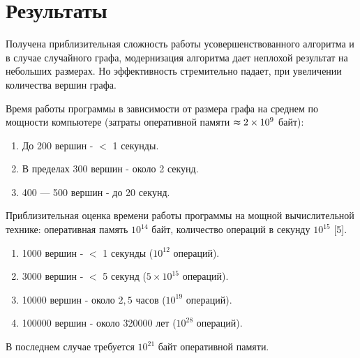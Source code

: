 \section{Результаты}
\label{sec:Chapter5} 
\large



Получена приблизительная сложность работы усовершенствованного алгоритма и в случае случайного графа, модернизация алгоритма дает неплохой результат на небольших размерах. Но эффективность стремительно падает, при увеличении количества вершин графа.

Время работы программы в зависимости от размера графа на среднем по мощности компьютере (затраты оперативной памяти $\thickapprox 2\times 10^9$ байт):
\begin{enumerate}
\item  До 200 вершин - $<$ 1 секунды.
\item  В пределах 300 вершин - около 2 секунд.
\item  400 — 500 вершин - до 20 секунд.
\end{enumerate}




Приблизительная оценка времени работы программы на мощной вычислительной технике:
оперативная память $10^{14}$ байт,
количество операций в секунду $10^{15}$ [5].
\begin{enumerate}
\item 1000 вершин - $<$ 1 секунды  ($10^{12}$  операций).
\item 3000 вершин - $<$ 5 секунд ($5\times 10^{15}$ операций).
\item 10000 вершин - около $2,5$ часов ($10^{19}$ операций).
\item 100000 вершин - около 320000 лет ($10 ^{28}$ операций).
\end{enumerate}
В последнем случае требуется $10^{21}$ байт оперативной памяти.


